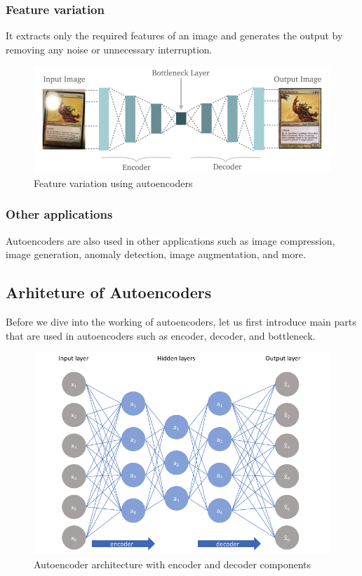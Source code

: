 \documentclass{article}
\begin{document}
		\subsubsection{Feature variation}

			It extracts only the required features of an image and generates the output by removing any noise or unnecessary interruption.

			\begin{figure}[H]
				\centering
				\includegraphics[width=0.8\linewidth]{images/feature-variation.png}
				\caption{Feature variation using autoencoders}
				\label{fig:feature-variation}
			\end{figure}
		
		\subsubsection{Other applications}

			Autoencoders are also used in other applications such as image compression, image generation, anomaly detection, image augmentation, and more.


	\subsection{Arhiteture of Autoencoders}
		Before we dive into the working of autoencoders, let us first introduce main parts that are used in autoencoders such as encoder, decoder, and bottleneck.

		\begin{figure}[h]
			\centering
			\includegraphics[width=0.5\linewidth]{images/encoder-decoder.png}
			\caption{Autoencoder architecture with encoder and decoder components}
			\label{fig:encoder-decoder}
		\end{figure}
\end{document}
